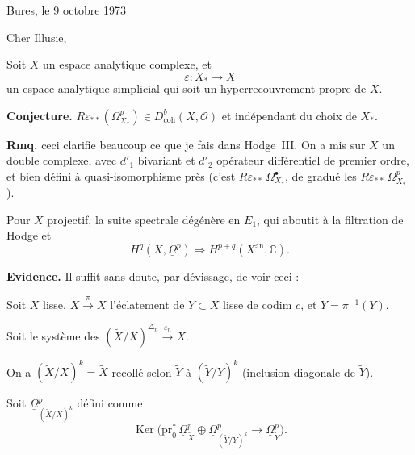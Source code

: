 \documentclass[11pt,a4paper]{article}
\theoremstyle{plain}
\theoremstyle{definition}
\DeclareMathOperator{\Ker}{Ker}
\newcommand{\an}{\mathrm{an}}
\newcommand{\coh}{\mathrm{coh}}
\begin{document}
\begin{flushright}
Bures, le 9 octobre 1973
\end{flushright}

\vspace{0.5cm}

Cher Illusie,

\vspace{0.3cm}

Soit $X$ un espace analytique complexe, et
\[
\varepsilon : X_{*} \longrightarrow X
\]
un espace analytique simplicial qui soit un hyperrecouvrement propre de $X$.

\vspace{0.3cm}

\noindent\textbf{Conjecture.} \quad $R\varepsilon_{**}(\Omega^{p}_{X_{*}}) \in D^{b}_{\coh}(X,\mathcal{O})$ et ind\'ependant du choix de $X_{*}$.


\vspace{0.3cm}

\noindent\textbf{Rmq.} ceci clarifie beaucoup ce que je fais dans Hodge~III. On a mis sur $X$ un double complexe, avec $d'_{1}$ bivariant et $d'_{2}$ op\'erateur diff\'erentiel de premier ordre, et bien d\'efini \`a quasi-isomorphisme pr\`es (c'est $R\varepsilon_{**}\,\Omega^{\bullet}_{X_{*}}$, de gradu\'e les $R\varepsilon_{**}\,\Omega^{p}_{X_{*}}$).

\vspace{0.3cm}

Pour $X$ projectif, la suite spectrale d\'eg\'en\`ere en $E_{1}$, qui aboutit \`a la filtration de Hodge et
\[
H^{q}(X, \underline{\Omega}^{p}) \Longrightarrow H^{p+q}(X^{\an}, \mathbb{C}).
\]

\vspace{0.3cm}

\noindent\textbf{Evidence.} Il suffit sans doute, par d\'evissage, de voir ceci :

Soit $X$ lisse, $\widetilde{X} \xrightarrow{\pi} X$ l'\'eclatement de $Y \subset X$ lisse de codim $c$, et $\widetilde{Y} = \pi^{-1}(Y)$.

Soit le syst\`eme des $(\widetilde{X}/X)^{\Delta_{n}} \xrightarrow{\varepsilon_{n}} X$.

On a $(\widetilde{X}/X)^{k} = \widetilde{X}$ recoll\'e selon $\widetilde{Y}$ \`a $(\widetilde{Y}/Y)^{k}$ (inclusion diagonale de $\widetilde{Y}$).

Soit $\underline{\Omega}^{p}_{(\widetilde{X}/X)^{k}}$ d\'efini comme
\[
\Ker\bigl(\mathrm{pr}_{0}^{*}\, \underline{\Omega}^{p}_{\widetilde{X}} \oplus \underline{\Omega}^{p}_{(\widetilde{Y}/Y)^{k}} \longrightarrow \underline{\Omega}^{p}_{\widetilde{Y}}\bigr).
\]
\end{document}
